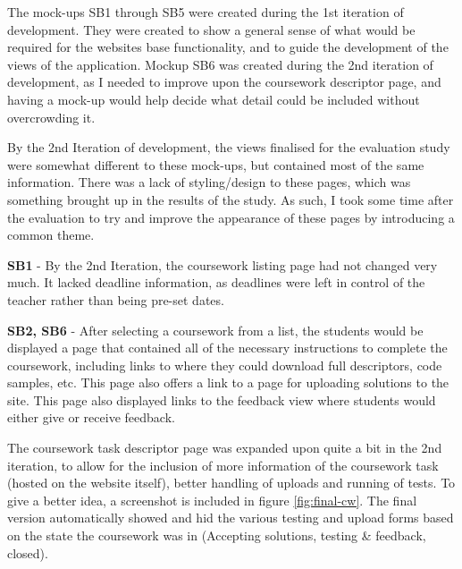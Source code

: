 \documentclass[a4paper,11pt]{report}
\begin{document}
The mock-ups SB1 through SB5 were created during the 1st iteration of development. They were created to show a general sense of what would be required for the websites base functionality, and to guide the development of the views of the application. Mockup SB6 was created during the 2nd iteration of development, as I needed to improve upon the coursework descriptor page, and having a mock-up would help decide what detail could be included without overcrowding it.\par
By the 2nd Iteration of development, the views finalised for the evaluation study were somewhat different to these mock-ups, but contained most of the same information. There was a lack of styling/design to these pages, which was something brought up in the results of the study. As such, I took some time after the evaluation to try and improve the appearance of these pages by introducing a common theme.\par
\textbf{SB1} - By the 2nd Iteration, the coursework listing page had not changed very much. It lacked deadline information, as deadlines were left in control of the teacher rather than being pre-set dates.\par
\textbf{SB2, SB6} - After selecting a coursework from a list, the students would be displayed a page that contained all of the necessary instructions to complete the coursework, including links to where they could download full descriptors, code samples, etc. This page also offers a link to a page for uploading solutions to the site. This page also displayed links to the feedback view where students would either give or receive feedback.\par
The coursework task descriptor page was expanded upon quite a bit in the 2nd iteration, to allow for the inclusion of more information of the coursework task (hosted on the website itself), better handling of uploads and running of tests. To give a better idea, a screenshot is included in figure \ref{fig:final-cw}. The final version automatically showed and hid the various testing and upload forms based on the state the coursework was in (Accepting solutions, testing \& feedback, closed).\par
\end{document}
